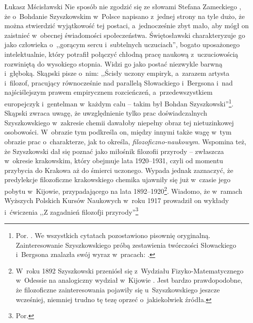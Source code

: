 \begin{artplenv}{Łukasz Mścisławski}
Nie sposób nie zgodzić się ze słowami Stefana Zameckiego
\parencite*[][s.~149]{zamecki_bohdan_1998}, %
 że o~Bohdanie Szyszkowskim w~Polsce napisano z~jednej strony na tyle dużo, że można stwierdzić wyjątkowość tej postaci, a~jednocześnie zbyt mało, aby mógł on zaistnieć w~obecnej świadomości społeczeństwa. Świętosławski 
\parencite*[][]{swietoslawski_sp_1931} %
 charakteryzuje go jako człowieka o~,,gorącym sercu i~subtelnych uczuciach'', bogato uposażonego intelektualnie, który potrafił połączyć chłodną pracę naukową z~uczuciowością rozwiniętą do wysokiego stopnia. Widzi go jako postać niezwykle barwną i~głęboką. Skąpski pisze o~nim: ,,Ścisły uczony empiryk, a~zarazem artysta i~filozof, pracujący równocześnie nad parallelą Słowackiego i~Bergsona i~nad najściślejszym prawem empirycznem rozcieńczeń, a~przedewszystkiem europejczyk i~gentelman w~każdym calu -- takim był Bohdan Szyszkowski''\footnote{Por. 
\parencite[][]{skapski_charakterystyka_1931}. %
 We wszystkich cytatach pozostawiono pisownię oryginalną. Zainteresowanie Szyszkowskiego próbą zestawienia twórczości Słowackiego i~Bergsona znalazła swój wyraz w~pracach: 
\parencites[][]{szyszkowski_slowacki_1920-1}[][]{szyszkowski_slowacki_1920}[][]{szyszkowski_slowacki_1920-2}[][]{szyszkowski_slowacki_1921}.%
}. Skąpski zwraca uwagę, że uwzględnienie tylko prac doświadczalnych Szyszkowskiego w~zakresie chemii dawałoby niepełny obraz tej nietuzinkowej osobowości. W~obrazie tym podkreśla on, między innymi także wagę w~tym obrazie prac o~charakterze, jak to określa, \textit{filozoficzno-naukowym}. Wspomina też, że Szyszkowski dał się poznać jako miłośnik filozofii przyrody -- zwłaszcza w~okresie krakowskim, który obejmuje lata 1920--1931, czyli od momentu przybycia do Krakowa aż do śmierci uczonego. Wypada jednak zaznaczyć, że predylekcje filozoficzne krakowskiego chemika ujawniły się już w~czasie jego pobytu w~Kijowie, przypadającego na lata 1892--1920\footnote{W~roku 1892 Szyszkowski przeniósł się z~Wydziału Fizyko-Matematycznego w~Odessie na analogiczny wydział w~Kijowie 
\parencite[][]{sroka_szyszkowski_2002}. %
 Jest bardzo prawdopodobne, że filozoficzne zainteresowania pojawiły się u~Szyszkowskiego jeszcze wcześniej, niemniej trudno tę tezę oprzeć o~jakiekolwiek źródła.}. Wiadomo, że w~ramach Wyższych Polskich Kursów Naukowych w~roku 1917 prowadził on wykłady i~ćwiczenia ,,Z zagadnień filozofji przyrody''\footnote{Por. 
}
\end{artplenv}
